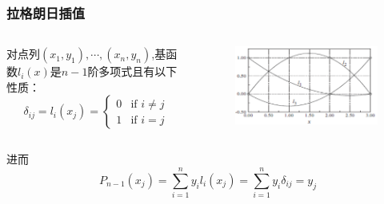 \documentclass[red,compress]{beamer}
\begin{document}
\begin{frame}
\frametitle{拉格朗日插值}

\begin{columns}[T]
对点列$(x_1,y_1),\cdots,(x_n,y_n)$,基函数$l_i(x)$是$n-1$阶多项式且有以下性质：
\begin{equation*}
\delta_{ij} = l_i(x_j)=
	\begin{cases}
        0 & \text{if $i\neq j$}\\
        1 & \text{if $i=j$}
    \end{cases}
\end{equation*}

\begin{figure}
\center
\includegraphics[width=\textwidth]{lagrange.png}
\end{figure}
\end{columns}

进而
\begin{equation*}
	P_{n-1}(x_j)=\sum_{i=1}^{n}y_{i}l_i(x_j)=\sum_{i=1}^{n}y_i\delta_{ij}=y_j
\end{equation*}

\end{frame}
\end{document}

